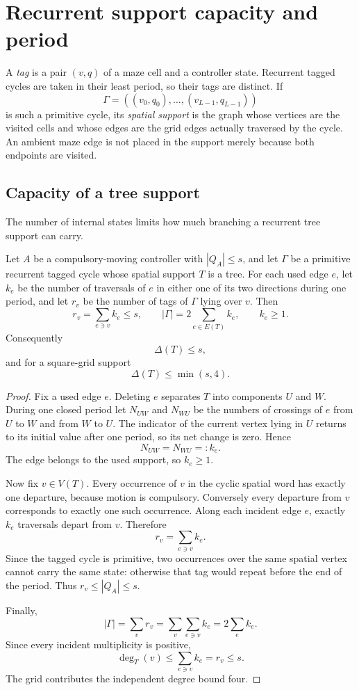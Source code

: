 \section{Recurrent support capacity and period}\label{sec:support-structure}

A \emph{tag} is a pair $(v,q)$ of a maze cell and a controller state. Recurrent tagged cycles are taken in their least period, so their tags are distinct. If
\[
 \Gamma=((v_0,q_0),\ldots,(v_{L-1},q_{L-1}))
\]
is such a primitive cycle, its \emph{spatial support} is the graph whose vertices are the visited cells and whose edges are the grid edges actually traversed by the cycle.  An ambient maze edge is not placed in the support merely because both endpoints are visited.



\subsection{Capacity of a tree support}

The number of internal states limits how much branching a recurrent tree support can carry.

\begin{theorem}\label{thm:support-capacity}
Let $A$ be a compulsory-moving controller with $|Q_A|\le s$, and let $\Gamma$ be a primitive recurrent tagged cycle whose spatial support $T$ is a tree.  For each used edge $e$, let $k_e$ be the number of traversals of $e$ in either one of its two directions during one period, and let $r_v$ be the number of tags of $\Gamma$ lying over $v$.  Then
\[
 \boxed{r_v=\sum_{e\ni v}k_e\le s},
 \qquad
 \boxed{|\Gamma|=2\sum_{e\in E(T)}k_e},
 \qquad k_e\ge1.
\]
Consequently
\[
 \Delta(T)\le s,
\]
and for a square-grid support
\[
 \Delta(T)\le\min(s,4).
\]
\end{theorem}
\begin{proof}
Fix a used edge $e$.  Deleting $e$ separates $T$ into components $U$ and $W$.  During one closed period let $N_{UW}$ and $N_{WU}$ be the numbers of crossings of $e$ from $U$ to $W$ and from $W$ to $U$.  The indicator of the current vertex lying in $U$ returns to its initial value after one period, so its net change is zero.  Hence
\[
 N_{UW}=N_{WU}=:k_e.
\]
The edge belongs to the used support, so $k_e\ge1$.

Now fix $v\in V(T)$.  Every occurrence of $v$ in the cyclic spatial word has exactly one departure, because motion is compulsory.  Conversely every departure from $v$ corresponds to exactly one such occurrence.  Along each incident edge $e$, exactly $k_e$ traversals depart from $v$.  Therefore
\[
 r_v=\sum_{e\ni v}k_e.
\]
Since the tagged cycle is primitive, two occurrences over the same spatial vertex cannot carry the same state: otherwise that tag would repeat before the end of the period.  Thus $r_v\le |Q_A|\le s$.

Finally,
\[
 |\Gamma|=\sum_v r_v
 =\sum_v\sum_{e\ni v}k_e
 =2\sum_e k_e.
\]
Since every incident multiplicity is positive,
\[
 \deg_T(v)\le\sum_{e\ni v}k_e=r_v\le s.
\]
The grid contributes the independent degree bound four.
\end{proof}

